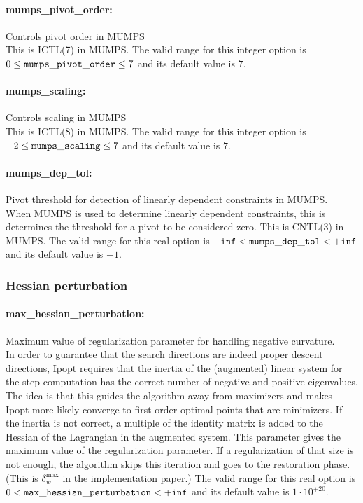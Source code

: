 \paragraph{mumps\_pivot\_order:} Controls pivot order in MUMPS $\;$ \\
 This is ICTL(7) in MUMPS. The valid range for this integer option is
$0 \le {\tt mumps\_pivot\_order } \le 7$
and its default value is $7$.


\paragraph{mumps\_scaling:} Controls scaling in MUMPS $\;$ \\
 This is ICTL(8) in MUMPS. The valid range for this integer option is
$-2 \le {\tt mumps\_scaling } \le 7$
and its default value is $7$.


\paragraph{mumps\_dep\_tol:} Pivot threshold for detection of linearly dependent constraints in MUMPS. $\;$ \\
 When MUMPS is used to determine linearly
dependent constraints, this is determines the
threshold for a pivot to be considered zero. 
This is CNTL(3) in MUMPS. The valid range for this real option is 
${\tt -inf} <  {\tt mumps\_dep\_tol } <  {\tt +inf}$
and its default value is $-1$.

\subsubsection{Hessian perturbation}

\paragraph{max\_hessian\_perturbation:} Maximum value of regularization parameter for handling negative curvature. $\;$ \\
 In order to guarantee that the search directions
are indeed proper descent directions, Ipopt
requires that the inertia of the (augmented)
linear system for the step computation has the
correct number of negative and positive
eigenvalues. The idea is that this guides the
algorithm away from maximizers and makes Ipopt
more likely converge to first order optimal
points that are minimizers. If the inertia is not
correct, a multiple of the identity matrix is
added to the Hessian of the Lagrangian in the
augmented system. This parameter gives the
maximum value of the regularization parameter. If
a regularization of that size is not enough, the
algorithm skips this iteration and goes to the
restoration phase. (This is $\delta_w^{\max}$ in the
implementation paper.) The valid range for this real option is 
$0 <  {\tt max\_hessian\_perturbation } <  {\tt +inf}$
and its default value is $1 \cdot 10^{+20}$.



